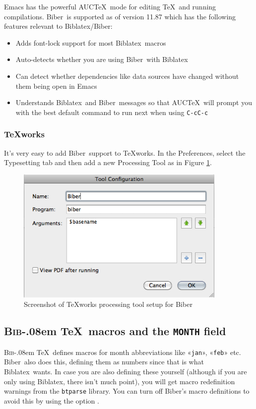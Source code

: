 \documentclass{ltxdockit}
\def\BibTeX{\textsc{Bib}\kern-.08em \TeX}
\newcommand*{\biber}{Biber\xspace}
\newcommand*{\biblatex}{Biblatex\xspace}
\begin{document}
Emacs has the powerful AUC\TeX\ mode for editing \TeX\ and running
compilations. \biber\ is supported as of version 11.87 which has the
following features relevant to \biblatex/\biber:

\begin{itemize}
\item Adds font-lock support for most \biblatex\ macros
\item Auto-detects whether you are using \biber\ with \biblatex\
\item Can detect whether dependencies like data sources have changed without
  them being open in Emacs
\item Understands \biblatex\ and \biber\ messages so that
  AUC\TeX\ will prompt you with the best default command to run next
  when using \verb+C-cC-c+
\end{itemize}

\subsubsection{\TeX works}

It's very easy to add \biber\ support to \TeX works. In the Preferences,
select the Typesetting tab and then add a new Processing Tool as in Figure
\ref{fig:biber-texworks}.

\begin{figure}[!htpb]
  \centering
  \includegraphics[width=4in,keepaspectratio=true]{biber-texworks.png}
  \caption{Screenshot of \TeX works processing tool setup for \biber}
  \label{fig:biber-texworks}
\end{figure}

\subsection{\BibTeX\ macros and the \texttt{MONTH} field}

\BibTeX\ defines macros for month abbreviations
like «\verb+jan+», «\verb+feb+» etc. \biber\ also does this,
defining them as numbers since that is what \biblatex\ wants. In
case you are also defining these yourself (although if you are only
using \biblatex, there isn't much point), you will get macro
redefinition warnings from the \verb+btparse+ library. You can turn
off \biber's macro definitions to avoid this by using the option
\opt{--nostdmacros}.
\end{document}
